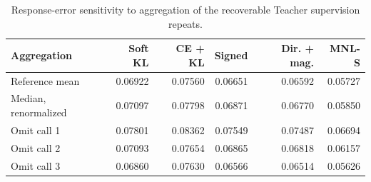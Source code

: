\begin{table}[pos=htbp]
\centering\footnotesize
\caption{Response-error sensitivity to aggregation of the recoverable Teacher supervision repeats.}
\label{tab:teacher_aggregation}
\setlength{\tabcolsep}{3pt}
\renewcommand{\arraystretch}{1.12}
\begin{tabular}{@{}lrrrrr@{}}
\toprule
Aggregation & Soft KL & CE + KL & Signed & Dir. + mag. & MNL-S \\
\midrule
Reference mean & 0.06922 & 0.07560 & 0.06651 & 0.06592 & 0.05727 \\
Median, renormalized & 0.07097 & 0.07798 & 0.06871 & 0.06770 & 0.05850 \\
Omit call 1 & 0.07801 & 0.08362 & 0.07549 & 0.07487 & 0.06694 \\
Omit call 2 & 0.07093 & 0.07654 & 0.06865 & 0.06818 & 0.06157 \\
Omit call 3 & 0.06860 & 0.07630 & 0.06566 & 0.06514 & 0.05626 \\
\bottomrule
\end{tabular}
\par{}
\end{table}

